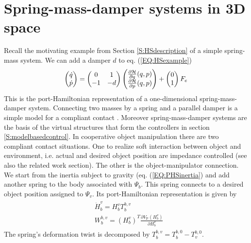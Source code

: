 \documentclass[a4paper,twoside, openright,12pt]{report}
\newcommand{\g}[1]{\text{#1}}
\begin{document}
\section{Spring-mass-damper systems in 3D space}\label{S:springmassdampers}
Recall the motivating example from Section \ref{S:HSdescription} of a simple spring-mass system. We can add a damper $d$ to eq. (\ref{EQ:HSexample})
\begin{equation}
	\begin{pmatrix}\dot{q} \\ \dot{p}\end{pmatrix} =
	\begin{pmatrix}0 & 1 \\ -1 & -d\end{pmatrix}
	\begin{pmatrix}\frac{\partial \mathcal{H}}{\partial q}(q,p) \\ \frac{\partial \mathcal{H}}{\partial p}(q,p)\end{pmatrix} + 
	\begin{pmatrix}0 \\ 1\end{pmatrix} F_e\\  
\end{equation}
This is the port-Hamiltonian representation of a one-dimensional spring-mass-damper system. Connecting two masses by a spring and a parallel damper is a simple model for a compliant contact \cite{Duindam_09}. Moreover spring-mass-damper systems are the basis of the virtual structures that form the controllers in section \ref{S:modelbasedcontrol}. In cooperative object manipulation there are two compliant contact situations. One to realize soft interaction between object and environment, i.e. actual and desired object position are impedance controlled (see also the related work section). The other is the object-manipulator connection. We start from the inertia subject to gravity (eq. (\ref{EQ:PHSinertia}) and add another spring to the body associated with $\Psi_b$. This spring connects to a desired object position assigned to $\Psi_v$. Its port-Hamiltonian representation is given by
\begin{eqnarray}
\begin{aligned}
	&\dot{H}_b^v = H_b^v T_b^{b,v}\\
	&W_b^{b,v} = (H_b^v)^T\frac{\partial V_\g{P}(H_b^v)}{\partial H_b^v}
\end{aligned}
\end{eqnarray}
The spring's deformation twist is decomposed by $T_b^{b,v} = T_b^{b,0} - T_v^{b,0}$.
\end{document}
